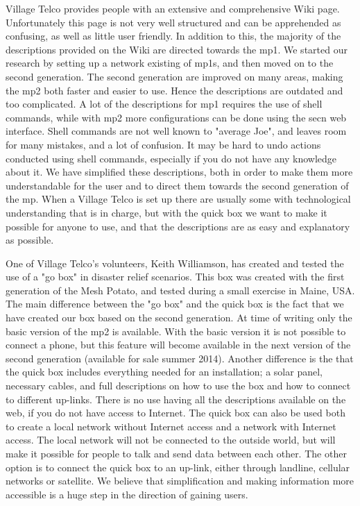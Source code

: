 Village Telco provides people with an extensive and comprehensive Wiki page. Unfortunately this page is not very well structured and can be apprehended as confusing, as well as little user friendly. In addition to this, the majority of the descriptions provided on the Wiki are directed towards the \gls{mp1}. We started our research by setting up a network existing of \glspl{mp1}, and then moved on to the second generation. The second generation are improved on many areas, making the \gls{mp2} both faster and easier to use. Hence the descriptions are outdated and too complicated. A lot of the descriptions for \gls{mp1} requires the use of shell commands, while with \gls{mp2} more configurations can be done using the \gls{secn} web interface. Shell commands are not well known to "average Joe", and leaves room for many mistakes, and a lot of confusion. It may be hard to undo actions conducted using shell commands, especially if you do not have any knowledge about it. We have simplified these descriptions, both in order to make them more understandable for the user and to direct them towards the second generation of the \gls{mp}. When a Village Telco is set up there are usually some with technological understanding that is in charge, but with the \gls{quick} box we want to make it possible for anyone to use, and that the descriptions are as easy and explanatory as possible. 

One of Village Telco's volunteers, Keith Williamson, has created and tested the use of a "go box" in disaster relief scenarios. This box was created with the first generation of the Mesh Potato, and tested during a small exercise in Maine, USA. The main difference between the "go box" and the \gls{quick} box is the fact that we have created our box based on the second generation. At time of writing only the basic version of the \gls{mp2} is available. With the basic version it is not possible to connect a phone, but this feature will become available in the next version of the second generation (available for sale summer 2014). Another difference is the that the \gls{quick} box includes everything needed for an installation;  a solar panel, necessary cables, and full descriptions on how to use the box and how to connect to different up-links. There is no use having all the descriptions available on the web, if you do not have access to Internet. The \gls{quick} box can also be used both to create a local network without Internet access and a network with Internet access. The local network will not be connected to the outside world, but will make it possible for people to talk and send data between each other. The other option is to connect the \gls{quick} box to an up-link, either through landline, cellular networks or satellite. We believe that simplification and making information more accessible is a huge step in the direction of gaining users. 

